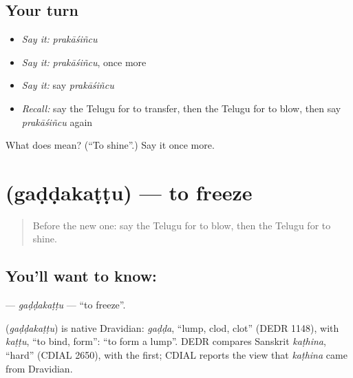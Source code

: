\subsection*{Your turn}
\begin{itemize}
\raggedright
  \item \emph{Say it:} \emph{prakāśiñcu}
  \item \emph{Say it:} \emph{prakāśiñcu}, once more
  \item \emph{Say it:} say \emph{prakāśiñcu}
  \item \emph{Recall:} say the Telugu for to transfer, then the Telugu for to blow, then say \emph{prakāśiñcu} again
\end{itemize}

\begin{tcolorbox}[breakable,colback=teal!4,colframe=teal!35!black,title={Before you move on}]
What does  mean? (\textquotedblleft{}To shine\textquotedblright{}.) Say it once more.
\end{tcolorbox}
\section[\texorpdfstring{\te{గడ్డకట్టు} (gaḍḍakaṭṭu)}{గడ్డకట్టు (gaḍḍakaṭṭu)}]{ (gaḍḍakaṭṭu) — to freeze}

\label{lesson:TE-C244-gaddakattu}



\begin{quote}
Before the new one: say the Telugu for to blow, then the Telugu for to shine.
\end{quote}

\subsection*{You'll want to know: }
\textbf{} — \emph{gaḍḍakaṭṭu} — \textquotedblleft{}to freeze\textquotedblright{}.

\begin{cousinweb}
\textbf{} (\emph{gaḍḍakaṭṭu}) is native Dravidian: \emph{gaḍḍa}, \textquotedblleft{}lump, clod, clot\textquotedblright{} (DEDR 1148), with \emph{kaṭṭu}, \textquotedblleft{}to bind, form\textquotedblright{}: \textquotedblleft{}to form a lump\textquotedblright{}. DEDR compares Sanskrit \emph{kaṭhina}, \textquotedblleft{}hard\textquotedblright{} (CDIAL 2650), with the first; CDIAL reports the view that \emph{kaṭhina} came from Dravidian.
\end{cousinweb}

